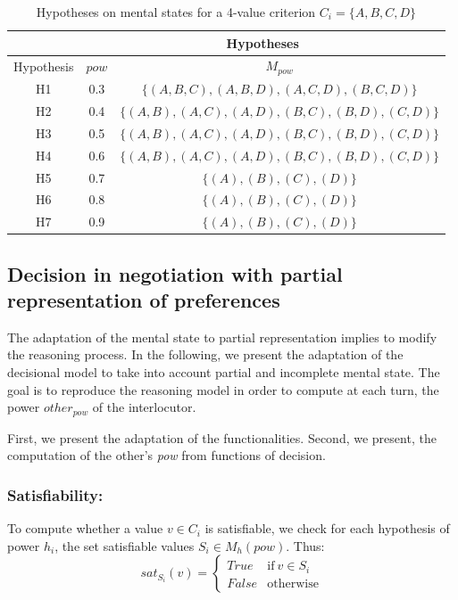 \documentclass[sigconf]{aamas}  %
\begin{document}
	\begin{table}[h]
		\centering
		\caption{Hypotheses on mental states for a 4-value criterion $C_i=\{A, B, C, D\}$}
		\begin{tabular}{ |c|c|c| }
			\hline
			& \multicolumn{2}{c|}{Hypotheses}  \\
			\hline
			Hypothesis & $pow$ & $M_{pow}$ \\
			\hline
			H1&0.3&$\{ (A,B,C) , (A,B,D), (A,C,D), (B,C,D) \}$ \\
			\hline
			H2&0.4&$\{ (A,B), (A,C), (A,D), (B,C), (B,D), (C,D) \}$ \\
			\hline
			H3&0.5&$\{ (A,B), (A,C), (A,D), (B,C), (B,D), (C,D) \}$\\
			\hline
			H4&0.6&$\{ (A,B), (A,C), (A,D), (B,C), (B,D), (C,D) \}$ \\
			\hline
			H5&0.7&$\{ (A), (B), (C), (D) \}$\\
			\hline
			H6&0.8&$\{ (A), (B), (C), (D) \}$ \\
			\hline
			H7&0.9&$\{ (A), (B), (C), (D) \}$ \\
			\hline
		\end{tabular}

		\label{table:poss}
	\end{table}
	
	\subsection{Decision in negotiation with partial representation of preferences}
	The adaptation of the mental state to partial representation implies to modify the reasoning process. In the following, we present the adaptation of the decisional model to take into account partial and incomplete mental state. The goal is to reproduce the reasoning model in order to compute at each turn, the power $other_{pow}$ of the interlocutor. 
	
	First, we present the adaptation of the functionalities. Second, we present, the computation of the other's \emph{pow} from functions of decision.   
	
	\subsubsection{Satisfiability:}
	To compute whether a value $v \in C_i$ is satisfiable, we check for each hypothesis of power $h_i$, the set satisfiable values $S_i \in M_h(pow)$.
	Thus: 
	\begin{equation}
	sat_{S_i}(v)= \left\{\begin{array}{ll}
	True	 & \mathrm{if\ }  v \in S_i\\
	False & \mathrm{otherwise}
	\end{array}\right.
	\end{equation}
	
\end{document}
